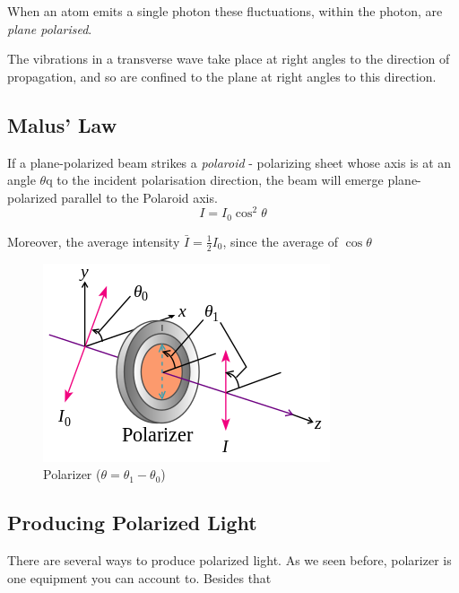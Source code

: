 \documentclass[UTF8]{book}
\begin{document}
When an atom emits a single photon these fluctuations, within the photon, are \emph{plane polarised}.

The vibrations in a transverse wave take place at right angles to the direction of propagation, and so are confined to the plane at right angles to this direction.
\subsection{Malus' Law}
If a plane-polarized beam strikes a \emph{polaroid} - polarizing sheet whose axis is at an angle $\theta$q to the incident polarisation direction, the beam will emerge plane-polarized parallel to the Polaroid axis.
\[I=I_0\cos ^2\theta \]

Moreover, the average intensity $\bar{I}=\frac{1}{2}I_0$, since the average of $\cos \theta $
\begin{figure}[H]
\centering
\label{fig:14}
\includegraphics[scale=0.5]{Figure/14.PNG}
\caption{Polarizer ($\theta = \theta _1-\theta _0$)}
\end{figure}
\subsection{Producing Polarized Light}
There are several ways to produce polarized light. As we seen before, polarizer is one equipment you can account to. Besides that
\end{document}
